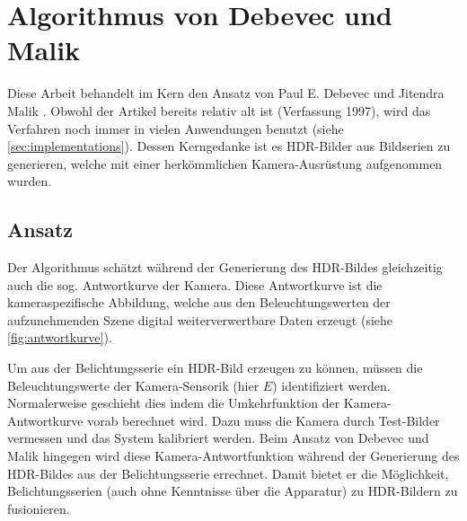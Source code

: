\chapter{Algorithmus von Debevec und Malik \cite{paper}}
\label{chap:algo}
Diese Arbeit behandelt im Kern den Ansatz von Paul E. Debevec und Jitendra Malik \cite{paper}. Obwohl der Artikel bereits relativ alt ist (Verfassung 1997), wird das Verfahren noch immer in vielen Anwendungen benutzt (siehe \autoref{sec:implementations}). Dessen Kerngedanke ist es \gls{HDR}-Bilder aus Bildserien zu generieren, welche mit einer herkömmlichen Kamera-Ausrüstung aufgenommen wurden.

\section{Ansatz}
Der Algorithmus schätzt während der Generierung des \gls{HDR}-Bildes gleichzeitig auch die sog. Antwortkurve der Kamera. Diese Antwortkurve ist die kameraspezifische Abbildung, welche aus den Beleuchtungswerten der aufzunehmenden Szene digital weiterverwertbare Daten erzeugt (siehe \autoref{fig:antwortkurve}). 

Um aus der Belichtungsserie ein \gls{HDR}-Bild erzeugen zu können, müssen die Beleuchtungswerte der Kamera-Sensorik (hier $E$) identifiziert werden. Normalerweise geschieht dies indem die Umkehrfunktion der Kamera-Antwortkurve vorab berechnet wird. Dazu muss die Kamera durch Test-Bilder vermessen und das System kalibriert werden. Beim Ansatz von Debevec und Malik hingegen wird diese Kamera-Antwortfunktion während der Generierung des \gls{HDR}-Bildes aus der Belichtungsserie errechnet. Damit bietet er die Möglichkeit, Belichtungsserien (auch ohne Kenntnisse über die Apparatur) zu \gls{HDR}-Bildern zu fusionieren.


